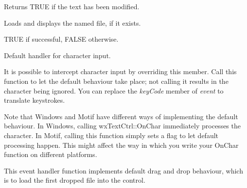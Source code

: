 \label{wxtextctrlismodified}


Returns TRUE if the text has been modified.

\label{wxtextctrlloadfile}


Loads and displays the named file, if it exists.




TRUE if successful, FALSE otherwise.

\label{wxtextctrlonchar}


Default handler for character input.


It is possible to intercept character
input by overriding this member. Call this function
to let the default behaviour take place; not calling
it results in the character being ignored. You can
replace the {\it keyCode} member of {\it event} to
translate keystrokes.

Note that Windows and Motif have different ways
of implementing the default behaviour. In Windows,
calling wxTextCtrl::OnChar immediately
processes the character. In Motif,
calling this function simply sets a flag
to let default processing happen. This might affect
the way in which you write your OnChar function
on different platforms.



\label{wxtextctrlondropfiles}


This event handler function implements default drag and drop behaviour, which
is to load the first dropped file into the control.




